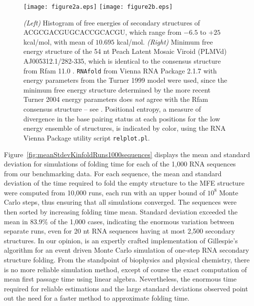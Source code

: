 \begin{figure*} [!h]
\begin{center}
\texttt{[image: figure2a.eps]}
\texttt{[image: figure2b.eps]}
\caption{\small
{\em (Left)} Histogram of free energies of secondary structures of
ACGCGACGUGCACCGCACGU, which range from $-6.5$ to $+25$ kcal/mol, with
mean of $10.695$ kcal/mol.
{\em (Right)} Minimum free energy structure of the 54 nt Peach Latent Mosaic
Viroid (PLMVd) AJ005312.1/282-335, which is identical to the consensus
structure from Rfam 11.0 \cite{Gardner.nar11}. {\tt RNAfold} from
Vienna RNA Package 2.1.7 with energy parameters from the Turner 1999
model were used, since the minimum free energy structure determined by
the more recent Turner 2004 energy parameters
does {\em not} agree with the Rfam consensus structure -- see
\cite{syntheticHammerheads}. Positional entropy, a measure
of divergence in the base pairing status at each positions for the
low energy ensemble of structures, is indicated by color, using the
RNA Vienna Package utility script {\tt relplot.pl}.
}
\label{fig:PLMVd}
\end{center}
\end{figure*}


Figure~\ref{fig:meanStdevKinfoldRuns1000sequences} displays the mean
and standard deviation for \kinfold simulations of folding time
for each of the 1,000 RNA sequences from our benchmarking data. For
each sequence, the mean and standard deviation of the time required to
fold the empty structure to the MFE structure were computed from
10,000 \kinfold runs, each run with an upper bound of $10^8$
Monte Carlo steps, thus ensuring that all simulations converged. The
sequences were then sorted by increasing folding time mean. Standard
deviation exceeded the mean in $83.9\%$ of the 1,000 cases, indicating
the enormous variation between separate \kinfold runs, even for
20 nt RNA sequences having at most 2,500 secondary structures. In our
opinion, \kinfold is an expertly crafted implementation of
Gillespie's algorithm for an event driven Monte Carlo simulation of
one-step RNA secondary structure folding. From the standpoint of
biophysics and physical chemistry, there is no more reliable
simulation method, except of course the exact computation of mean
first passage time using linear algebra. Nevertheless, the enormous
time required for reliable \kinfold estimations and the large
standard deviations observed point out the need for a faster method to
approximate folding time.


